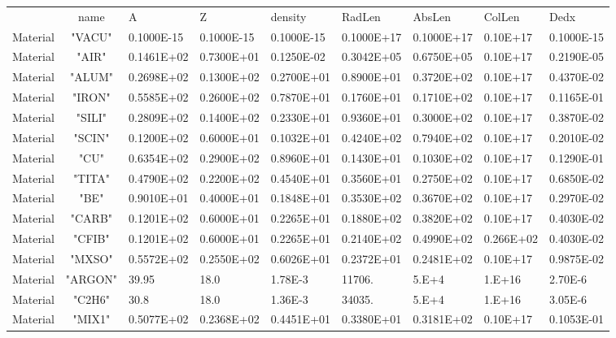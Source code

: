 \begin{tabular}{rclllllll}
         &  name   &      A      &    Z       &density    &RadLen     &AbsLen     &ColLen     & Dedx\\
Material & "VACU" &  0.1000E-15 & 0.1000E-15 & 0.1000E-15 & 0.1000E+17 & 0.1000E+17 & 0.10E+17 & 0.1000E-15\\
Material & "AIR"  &  0.1461E+02 & 0.7300E+01 & 0.1250E-02 & 0.3042E+05 & 0.6750E+05 & 0.10E+17 & 0.2190E-05\\
Material & "ALUM" &  0.2698E+02 & 0.1300E+02 & 0.2700E+01 & 0.8900E+01 & 0.3720E+02 & 0.10E+17 &0.4370E-02\\
Material & "IRON" &  0.5585E+02 & 0.2600E+02 & 0.7870E+01 & 0.1760E+01 & 0.1710E+02 & 0.10E+17 &0.1165E-01\\
Material & "SILI" &  0.2809E+02 & 0.1400E+02 & 0.2330E+01 & 0.9360E+01 & 0.3000E+02 & 0.10E+17 &0.3870E-02\\
Material & "SCIN" &  0.1200E+02 & 0.6000E+01 & 0.1032E+01 & 0.4240E+02 & 0.7940E+02 & 0.10E+17 &0.2010E-02\\
Material & "CU"   &  0.6354E+02 & 0.2900E+02 & 0.8960E+01 & 0.1430E+01 & 0.1030E+02 & 0.10E+17 &0.1290E-01\\
Material & "TITA" &  0.4790E+02 & 0.2200E+02 & 0.4540E+01 & 0.3560E+01 & 0.2750E+02 & 0.10E+17 &0.6850E-02\\
Material & "BE"   &  0.9010E+01 & 0.4000E+01 & 0.1848E+01 & 0.3530E+02 & 0.3670E+02 & 0.10E+17 &0.2970E-02\\
Material & "CARB" &  0.1201E+02 & 0.6000E+01 & 0.2265E+01 & 0.1880E+02 & 0.3820E+02 & 0.10E+17 &0.4030E-02\\
Material & "CFIB" &  0.1201E+02 & 0.6000E+01 & 0.2265E+01 & 0.2140E+02 & 0.4990E+02 & 0.266E+02 &0.4030E-02\\
Material & "MXSO" &  0.5572E+02 & 0.2550E+02 & 0.6026E+01 & 0.2372E+01 & 0.2481E+02 & 0.10E+17 &0.9875E-02\\
Material & "ARGON"&     39.95   & 18.0       & 1.78E-3    & 11706.     & 5.E+4      & 1.E+16   &2.70E-6\\
Material & "C2H6" &     30.8    & 18.0       & 1.36E-3    & 34035.     & 5.E+4      & 1.E+16   &3.05E-6\\
Material & "MIX1" &  0.5077E+02 & 0.2368E+02 & 0.4451E+01 & 0.3380E+01 & 0.3181E+02 & 0.10E+17 &0.1053E-01\\
\end{tabular}

